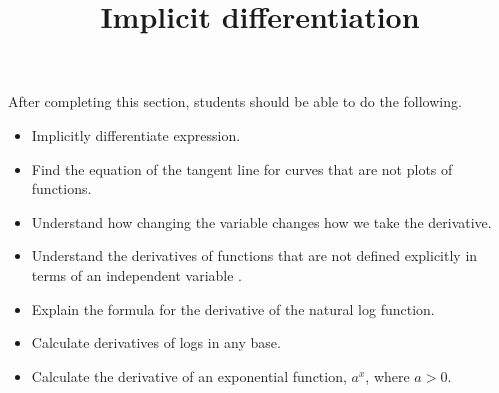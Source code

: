 \documentclass{ximera}
\title{Implicit differentiation}
\begin{document}
\begin{abstract}
\end{abstract}

\maketitle

\begin{sectionOutcomes}

After completing this section, students should be able to do the following.

\begin{itemize}
	\item Implicitly differentiate expression.
	\item Find the equation of the tangent line for curves that
          are not plots of functions.
	\item Understand how changing the variable changes how we take
          the derivative.
	\item Understand the derivatives of functions that are not
         defined explicitly in terms of an independent variable .
          \item Explain the formula for the derivative of the natural log function.
	\item Calculate derivatives of logs in any base.
	\item Calculate the derivative of an exponential function, $a^x$, where $a>0$.
\end{itemize}

\end{sectionOutcomes}
\end{document}
